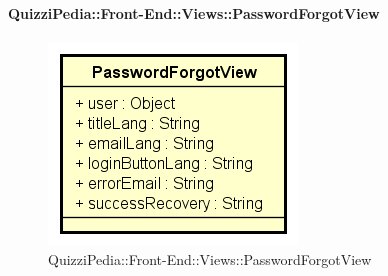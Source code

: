 \paragraph{QuizziPedia::Front-End::Views::PasswordForgotView}
\begin{figure} [ht]
	\centering
	\includegraphics[scale=0.80]{UML/Classi/Front-End/QuizziPedia_Front-end_Views_PasswordForgotView.png}
	\caption{QuizziPedia::Front-End::Views::PasswordForgotView}
\end{figure} \FloatBarrier
